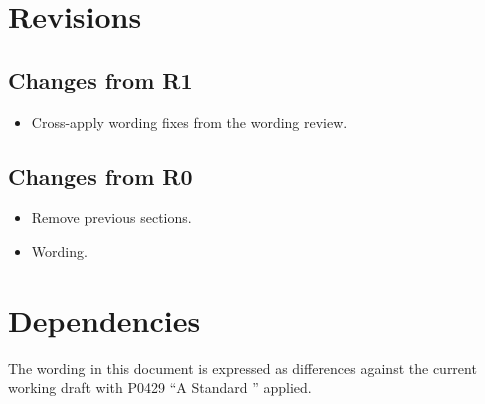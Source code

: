 \section{Revisions}

\subsection{Changes from R1}

\begin{itemize}
  \item Cross-apply wording fixes from the  wording review.
\end{itemize}

\subsection{Changes from R0}

\begin{itemize}
  \item Remove previous sections.
  \item Wording.
\end{itemize}

\section{Dependencies}

The wording in this document is expressed as differences against the current
working draft with P0429 ``A Standard '' applied.
